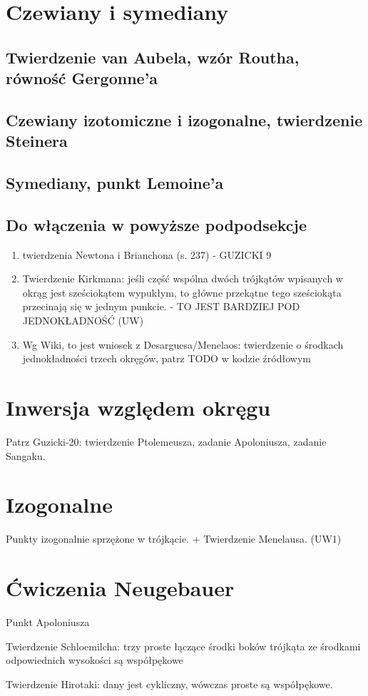 \section{Czewiany i symediany}
\subsection{Twierdzenie van Aubela, wzór Routha, równość Gergonne'a}
\subsection{Czewiany izotomiczne i izogonalne, twierdzenie Steinera}
\subsection{Symediany, punkt Lemoine'a}


\subsection{Do włączenia w powyższe podpodsekcje}
\begin{enumerate}
    \item twierdzenia Newtona i Brianchona (s. 237) - GUZICKI 9
    \item Twierdzenie Kirkmana: jeśli część wspólna dwóch trójkątów wpisanych w okrąg jest sześciokątem wypukłym, to główne przekątne tego sześciokąta przecinają się w jednym punkcie. - TO JEST BARDZIEJ POD JEDNOKŁADNOŚĆ (UW)
    \item Wg Wiki, to jest wniosek z Desarguesa/Menelaos: twierdzenie o środkach jednokładności trzech okręgów, patrz TODO w kodzie źródłowym %
\end{enumerate}

\section{Inwersja względem okręgu}
Patrz Guzicki-20: twierdzenie Ptolemeusza, zadanie Apoloniusza, zadanie Sangaku.


\section{Izogonalne}
Punkty izogonalnie sprzężone w trójkącie. + Twierdzenie Menelausa. (UW1)

\section{Ćwiczenia Neugebauer}
Punkt Apoloniusza

Twierdzenie Schloemilcha: trzy proste łączące środki boków trójkąta ze środkami odpowiednich wysokości są współpękowe %

Twierdzenie Hirotaki: dany jest cykliczny, wówczas proste są współpękowe.
